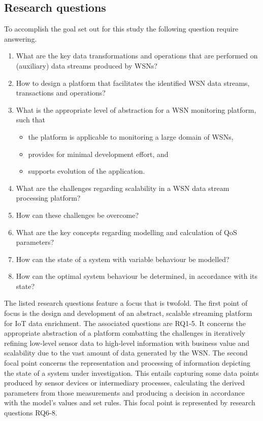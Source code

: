 \subsection{Research questions}
To accomplish the goal set out for this study the following question require answering.
\begin{enumerate}[leftmargin=24pt, label=\small RQ\arabic*]
\nospace
\item\label{rq:identify_processes} What are the key data transformations and operations that are performed on (auxiliary) data streams produced by WSNs?
\item\label{rq:desing_processes} How to design a platform that facilitates the identified WSN data streams, transactions and operations?
\item\label{rq:abstraction} What is the appropriate level of abstraction for a WSN monitoring platform, such that
\begin{itemize}
\nospace
\item the platform is applicable to monitoring a large domain of WSNs,
\item provides for minimal development effort, and
\item supports evolution of the application.
\end{itemize}
\item\label{rq:identify_scale} What are the challenges regarding scalability in a WSN data stream processing platform?
\item\label{rq:design_scale} How can these challenges be overcome?
\item\label{rq:idenfity_model} What are the key concepts regarding modelling and calculation of QoS parameters?
\item\label{rq:design_model} How can the state of a system with variable behaviour be modelled?
\item\label{rq:solve_model} How can the optimal system behaviour be determined, in accordance with its state?
\end{enumerate}

The listed research questions feature a focus that is twofold. The first point of focus is the design and development of an abstract, scalable streaming platform for IoT data enrichment. The associated questions are RQ1-5. It concerns the appropriate abstraction of a platform combatting the challenges in iteratively refining low-level sensor data to high-level information with business value and scalability due to the vast amount of data generated by the WSN.  The second focal point concerns the representation and processing of information depicting the state of a system under investigation. This entails capturing some data points produced by sensor devices or intermediary processes, calculating the derived parameters from those measurements and producing a decision in accordance with the model's values and set rules. This focal point is represented by research questions RQ6-8.

